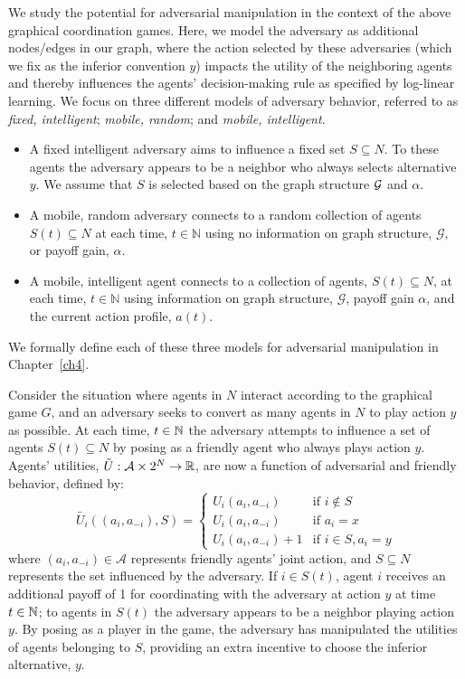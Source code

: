 We study the potential for adversarial manipulation in the context of the above graphical coordination games. Here, we model the adversary as additional nodes/edges in our graph, where the action selected by these adversaries (which we fix as the inferior convention $y$) impacts the utility of the neighboring agents and thereby influences the agents' decision-making rule as specified by log-linear learning.  We focus on three different models of adversary behavior, referred to as \emph{fixed, intelligent}; \emph{mobile, random}; and \emph{mobile, intelligent}.
%
\begin{itemize}
%
\item A fixed intelligent adversary aims to influence a fixed set $S\subseteq N$. To these agents the adversary appears to be a neighbor who always selects alternative  $y$.  We assume that $S$ is selected based on the graph structure ${\cal G}$ and $\alpha$.   
%
\item A mobile, random adversary connects to a random collection of agents $S(t)\subseteq N$ at each time, $t\in \mathbb{N}$ using no information on graph structure, $\mathcal{G},$ or payoff gain, $\alpha.$ 
%
\item A mobile, intelligent agent connects to a collection of agents, $S(t)\subseteq N$, at each time, $t\in \mathbb{N}$ using information on graph structure, $\mathcal{G}$, payoff gain $\alpha$, and the current action profile, $a(t)$.  
%
\end{itemize}
%
We formally define each of these three models for adversarial manipulation in Chapter~\ref{ch4}.

Consider the situation where agents in $N$ interact according to the graphical game $G$, and an adversary seeks to  convert as many agents in $N$ to play action $y$ as possible. 
At each time, $t\in \mathbb{N}$ the adversary attempts to influence a set of agents $S(t)\subseteq N$ by posing as a friendly agent who always plays action $y$. Agents' utilities, $\tilde{U}:\mathcal{A}\times 2^N\to\mathbb{R}$, are now a function of adversarial and friendly behavior, defined by:
\begin{equation}\label{e:new utility}
\tilde{U_i}((a_i,a_{-i}),S) = %
\begin{cases}
U_i(a_i,a_{-i})	&\text{if } i\notin S\\
U_i(a_i,a_{-i})	&\text{if } a_i = x\\
U_i(a_i,a_{-i}) + 1 &\text{if } i\in S,  a_i = y 
\end{cases}
\end{equation}
where $(a_i,a_{-i})\in\mathcal{A}$ represents friendly agents' joint action, and $S\subseteq N$ represents the set influenced by the adversary.
If  $i\in S(t)$, agent $i$ receives an additional payoff of 1 for coordinating with the adversary at action $y$ at time $t\in\mathbb{N}$; to agents in $S(t)$ the adversary appears to be a neighbor playing action $y$. By posing as a player in the game, the adversary has manipulated the utilities of agents belonging to $S$, providing an extra incentive to choose the inferior alternative, $y$. 

